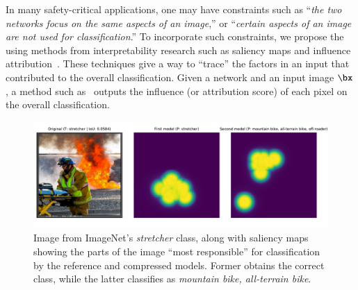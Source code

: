 In many safety-critical
applications,
  one may have constraints  
  such as
  ``{\sl the two networks focus on the same aspects of an image},'' or 
  ``{\sl certain aspects of an image are not used for classification}.''  To incorporate such constraints, we propose the using methods from interpretability research such as saliency maps and influence attribution~\cite{SimonyanVZ13,fergus2013Visualizing,Kim2018Interpretability,Mukund2017Axiomatic}.
  These techniques give a way to ``trace'' the factors in an input that contributed to the overall classification.  Given a network and an input image $\bx$, a method such as~\cite{Mukund2017Axiomatic,Kim2018Interpretability} outputs the influence (or attribution score) of each pixel on the overall classification.

 
\begin{figure}[!htb]
    \centering
    \includegraphics[width=\linewidth]{img/fire.pdf}
    \caption{\small Image from ImageNet's \textit{stretcher} class, along with saliency maps showing the parts of the image ``most responsible'' for classification by the reference and compressed models. Former obtains the correct class, while the latter classifies as {\em mountain bike, all-terrain bike}.}
    \label{fig:fire}
\end{figure}

